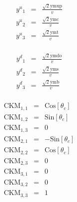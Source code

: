\begin{equation}
\label{value:27}
\begin{array}{rcl}
y{}^u{}_1 & = & 
\frac{\sqrt{2} \text{ymup}}{v}\\
y{}^u{}_2 & = & 
\frac{\sqrt{2} \text{ymc}}{v}\\
y{}^u{}_3 & = & 
\frac{\sqrt{2} \text{ymt}}{v}\\
\end{array}
\end{equation}

\begin{equation}
\label{value:28}
\begin{array}{rcl}
y{}^d{}_1 & = & 
\frac{\sqrt{2} \text{ymdo}}{v}\\
y{}^d{}_2 & = & 
\frac{\sqrt{2} \text{yms}}{v}\\
y{}^d{}_3 & = & 
\frac{\sqrt{2} \text{ymb}}{v}\\
\end{array}
\end{equation}

\begin{equation}
\label{value:29}
\begin{array}{rcl}
\text{CKM}{}_{1,1} & = & 
\text{Cos}\left[\theta {}_c\right]\\
\text{CKM}{}_{1,2} & = & 
\text{Sin}\left[\theta {}_c\right]\\
\text{CKM}{}_{1,3} & = & 
0\\
\text{CKM}{}_{2,1} & = & 
-\text{Sin}\left[\theta {}_c\right]\\
\text{CKM}{}_{2,2} & = & 
\text{Cos}\left[\theta {}_c\right]\\
\text{CKM}{}_{2,3} & = & 
0\\
\text{CKM}{}_{3,1} & = & 
0\\
\text{CKM}{}_{3,2} & = & 
0\\
\text{CKM}{}_{3,3} & = & 
1\\
\end{array}
\end{equation}
\clearpage
